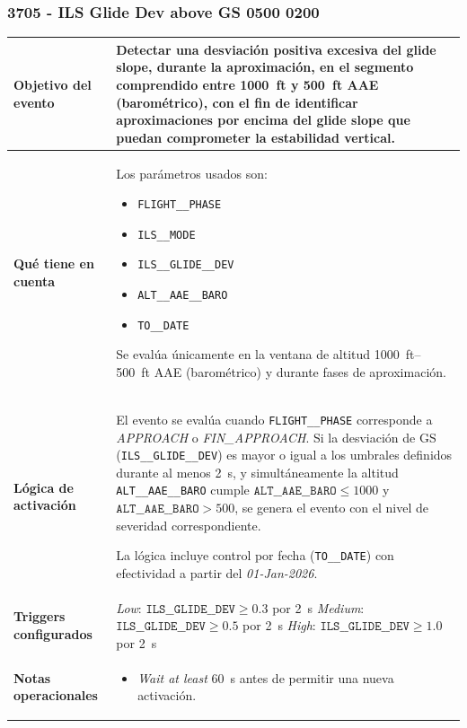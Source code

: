 \documentclass[11pt,a4paper]{article}
\begin{document}
	\subsubsection{3705 - ILS Glide Dev above GS 0500 0200}
	\renewcommand{\arraystretch}{1.3}
	
	\begin{longtable}{p{5cm} p{9.5cm}}
		\hline
		\textbf{Objetivo del evento} &
		Detectar una desviación positiva excesiva del glide slope, durante la aproximación, en el segmento comprendido entre \SI{1000}{ft} y \SI{500}{ft} AAE (barométrico), con el fin de identificar aproximaciones por encima del glide slope que puedan comprometer la estabilidad vertical. \\
		\hline
		\textbf{Qué tiene en cuenta} &
		Los parámetros usados son:
		\begin{itemize}
			\item \texttt{FLIGHT\_\_PHASE}
			\item \texttt{ILS\_\_MODE}
			\item \texttt{ILS\_\_GLIDE\_\_DEV}
			\item \texttt{ALT\_\_AAE\_\_BARO}
			\item \texttt{TO\_\_DATE}
		\end{itemize}
		Se evalúa únicamente en la ventana de altitud \SIrange{1000}{500}{ft} AAE (barométrico) y durante fases de aproximación. \\
		\hline
		\textbf{Lógica de activación} &
		El evento se evalúa cuando \texttt{FLIGHT\_\_PHASE} corresponde a \textit{APPROACH} o \textit{FIN\_APPROACH}.  
		Si la desviación de GS (\texttt{ILS\_\_GLIDE\_\_DEV}) es mayor o igual a los umbrales definidos durante al menos \SI{2}{s}, y simultáneamente la altitud \texttt{ALT\_\_AAE\_\_BARO} cumple \(\texttt{ALT\_\_AAE\_\_BARO} \le 1000\) y \(\texttt{ALT\_\_AAE\_\_BARO} > 500\), se genera el evento con el nivel de severidad correspondiente.  
		
		La lógica incluye control por fecha (\texttt{TO\_\_DATE}) con efectividad a partir del \textit{01-Jan-2026}. \\
		\hline
		\textbf{Triggers configurados} &
		\textit{Low}: \(\texttt{ILS\_\_GLIDE\_\_DEV} \ge 0.3\) por \SI{2}{s} \newline
		\textit{Medium}: \(\texttt{ILS\_\_GLIDE\_\_DEV} \ge 0.5\) por \SI{2}{s} \newline
		\textit{High}: \(\texttt{ILS\_\_GLIDE\_\_DEV} \ge 1.0\) por \SI{2}{s} \\
		\hline
		\textbf{Notas operacionales} &
		\begin{itemize}
			\item \textit{Wait at least} \SI{60}{s} antes de permitir una nueva activación.
	
		\end{itemize} \\
		\hline
	\end{longtable} \newpage
	
\end{document}
